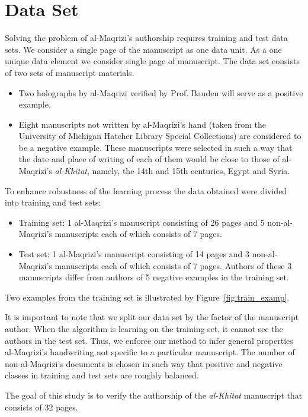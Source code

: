 \documentclass[a4paper,conference]{IEEEtran}
\begin{document}
\section{Data Set}
\label{sec:the_data}

Solving the problem of al-Maqrizi's authorship requires training and test data sets. 
We consider a single page of the manuscript as one data unit.
As a one unique data element we consider single page of manuscript. The data set consists of two sets of manuscript materials.
\begin{itemize}
	\item Two holographs by al-Maqrizi verified by Prof. Bauden will serve as a positive example.
	\item Eight manuscripts not written by al-Maqrizi's hand  (taken from the University of Michigan Hatcher Library Special Collections) are considered to be a negative example. These manuscripts were selected in such a way that the date and place of writing of each of them would be close to those of al-Maqrizi's  \textit{al-Khitat}, namely, the 14th and 15th centuries, Egypt and Syria.
\end{itemize}

To enhance robustness of the learning process the data obtained were divided into training and test sets:
\begin{itemize}
	\item Training set: 1 al-Maqrizi's manuscript consisting of 26 pages and 5 non-al-Maqrizi's manuscripts each of which consists of 7 pages.
	\item Test set: 1 al-Maqrizi's manuscript consisting of 14 pages and 3 non-al-Maqrizi's manuscripts each of which consists of 7 pages. Authors of these 3 manuscripts differ from authors of 5 negative examples in the training set.   
\end{itemize}

Two examples from the training set is illustrated by Figure~\ref{fig:train_examp}. 

It is important to note that we split our data set by the factor of the manuscript author. When the algorithm is learning on the training set, it cannot see the authors in the test set. Thus, we enforce our method to infer general properties al-Maqrizi's handwriting not specific to a particular manuscript. The number of non-al-Maqrizi's documents is chosen in such way that positive and negative classes in training and test sets are roughly balanced.

The goal of this study is to verify the authorship of the \textit{al-Khitat} manuscript that consists of 32 pages.
\end{document}
